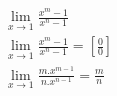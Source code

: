 \begin{ex}
\begin{align}
&\lim_{x\rightarrow 1} \frac{x^{m}-1}{x^{n}-1}\nonumber\\
&\lim_{x\rightarrow 1} \frac{x^{m}-1}{x^{n}-1}=\left[\frac{0}{0}\right]\nonumber\\
&\lim_{x\rightarrow 1} \frac{m.x^{m-1}}{n.x^{n-1}}=\frac{m}{n}\nonumber
\end{align}
\end{ex}